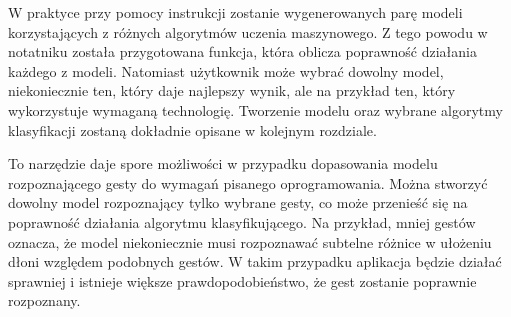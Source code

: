 \quad W praktyce przy pomocy instrukcji zostanie wygenerowanych parę modeli korzystających z różnych algorytmów uczenia maszynowego. Z tego powodu w notatniku została przygotowana funkcja, która oblicza poprawność działania każdego z modeli. Natomiast użytkownik może wybrać dowolny model, niekoniecznie ten, który daje najlepszy wynik, ale na przykład ten, który wykorzystuje wymaganą technologię. Tworzenie modelu oraz wybrane algorytmy klasyfikacji zostaną dokładnie opisane w kolejnym rozdziale. 

\quad To narzędzie daje spore możliwości w przypadku dopasowania modelu rozpoznającego gesty do wymagań pisanego oprogramowania. Można stworzyć dowolny model rozpoznający tylko wybrane gesty, co może przenieść się na poprawność działania algorytmu klasyfikującego. Na przykład, mniej gestów oznacza, że model niekoniecznie musi rozpoznawać subtelne różnice w ułożeniu dłoni względem podobnych gestów. W takim przypadku aplikacja będzie działać sprawniej i istnieje większe prawdopodobieństwo, że gest zostanie poprawnie rozpoznany. 